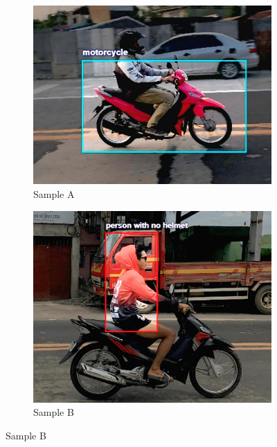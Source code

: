 \begin{refsection}
\begin{figure}[H]
    \begin{subfigure}{0.45\textwidth}
        \centering
        \includegraphics[width=\linewidth]{figures/Fig 4a.jpg}
        \caption{Sample A}
        \label{fig:4a}
    \end{subfigure}
    \hfill
    \begin{subfigure}{0.45\textwidth}
        \centering
        \includegraphics[width=\linewidth]{figures/Fig 4b.jpg}
        \caption{Sample B}
        \label{fig:4b}
    \end{subfigure}
    

\end{figure}
\end{refsection}

